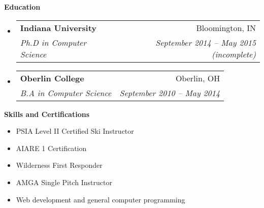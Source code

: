 \documentclass[letterpaper,11pt]{article}
\makeatletter
\newcommand{\resheading}[1]{{\large{\begin{minipage}{\textwidth}{\textbf{#1\vphantom{p\^{E}}}}\end{minipage}}}}
\newcommand{\ressubheading}[4]{
  \begin{tabular*}{6.5in}{l@{\extracolsep{\fill}}r}
    \textbf{#1} & #2 \\
    \textit{#3} & \textit{#4} \\
  \end{tabular*}\vspace{-6pt}}
\makeatother
\begin{document}
\resheading{Education}
\begin{itemize}
\item
  \ressubheading{Indiana University}{Bloomington, IN}{Ph.D in Computer Science}{September 2014 -- May 2015 (incomplete)}
\item
  \ressubheading{Oberlin College}{Oberlin, OH}{B.A in Computer Science}{September 2010 -- May 2014}
\end{itemize}

\resheading{Skills and Certifications}
\begin{itemize}
\item PSIA Level II Certified Ski Instructor
\item AIARE 1 Certification
\item Wilderness First Responder
\item AMGA Single Pitch Instructor
\item Web development and general computer programming
\end{itemize}
\end{document}
